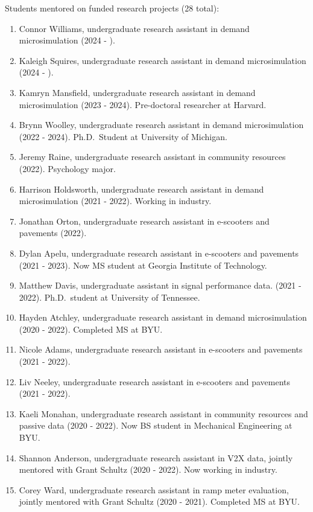 \documentclass[margin,line]{res}
\newif\ifdetail
\newcounter{enuminitialize}
\newenvironment{myenum}[1][]
{%
 \setcounter{enuminitialize}{#1}
 \addtocounter{enuminitialize}{2}
 \begin{enumerate}[left= 4pt, itemsep=8pt, start=\value{enuminitialize}, label=\arabic*\addtocounter{enumi}{-2}]
}
{%
 \end{enumerate}
}
\begin{document}
\begin{resume}
Students mentored on funded research projects (28 total):
\vspace{0.2cm}
\begin{myenum}[28]
  \ifdetail {\color{NavyBlue} \fi
  \item Connor Williams, undergraduate research assistant in demand microsimulation (2024 - ).
  \item Kaleigh Squires, undergraduate research assistant in demand microsimulation (2024 - ).
  \item Kamryn Mansfield, undergraduate research assistant in demand microsimulation (2023 - 2024). Pre-doctoral researcher at Harvard.
  \item Brynn Woolley, undergraduate research assistant in demand microsimulation (2022 - 2024). Ph.D.\ Student at University of Michigan.
  \item Jeremy Raine, undergraduate research assistant in community resources (2022). Psychology major.
  \item Harrison Holdsworth, undergraduate research assistant in demand microsimulation (2021 - 2022). Working in industry.
  \item Jonathan Orton, undergraduate research assistant in e-scooters and pavements (2022).
  \ifdetail } \fi
  \item Dylan Apelu, undergraduate research assistant in e-scooters and pavements (2021 - 2023). Now MS student at Georgia Institute of Technology.
  \item Matthew Davis, undergraduate assistant in signal performance data. (2021 - 2022). Ph.D.\ student at University of Tennessee.
  \item Hayden Atchley, undergraduate research assistant in demand microsimulation (2020 - 2022). Completed MS at BYU.
  \item Nicole Adams, undergraduate research assistant in e-scooters and pavements (2021 - 2022). 
  \item Liv Neeley, undergraduate research assistant in e-scooters and pavements (2021 - 2022). 
  \item Kaeli Monahan, undergraduate research assistant in community resources and passive data (2020 - 2022). Now BS student in Mechanical Engineering at BYU.
  \item Shannon Anderson, undergraduate research assistant in V2X data, jointly mentored with Grant Schultz (2020 - 2022). Now working in industry.
  \item Corey Ward, undergraduate research assistant in ramp meter evaluation, jointly mentored with Grant Schultz (2020 - 2021). Completed MS at BYU.

\end{myenum}
\end{resume}
\end{document}
